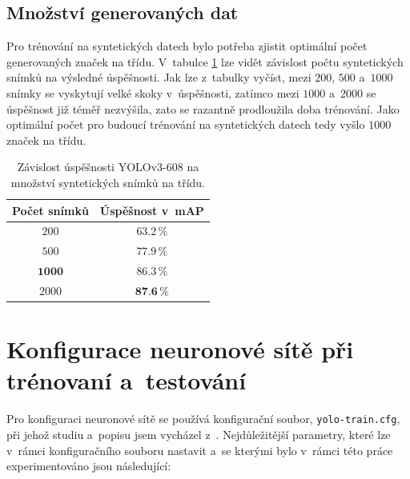 \subsection*{Množství generovaných dat}
Pro trénování na syntetických datech bylo potřeba zjistit optimální počet generovaných značek na třídu. V~tabulce \ref{tab:pocetSnimkuUspesnost} lze vidět závislost počtu syntetických snímků na výsledné úspěšnosti. Jak lze z~tabulky vyčíst, mezi $200$, $500$ a~$1000$ snímky se vyskytují velké skoky v~úspěšnosti, zatímco mezi $1000$ a~$2000$ se úspěšnost již téměř nezvýšila, zato se razantně prodloužila doba trénování. Jako optimální počet pro budoucí trénování na syntetických datech tedy vyšlo $1000$ značek na třídu.

\begin{table}[h]
	\vskip6pt
	\caption{Závislost úspěšnosti YOLOv3-608 na množství syntetických snímků na třídu.}
	\centering
	\begin{tabular}{cc}
		\toprule
		Počet snímků & Úspěšnost v~mAP\\
		\midrule
		$200$  & $63.2\,\%$ \\
		$500$  & $77.9\,\%$ \\
		$\textbf{1000}$ & $86.3\,\%$ \\
		$2000$ & $\textbf{87.6}\,\%$ \\
		\bottomrule
	\end{tabular}
	\label{tab:pocetSnimkuUspesnost}
\end{table}


\section{Konfigurace neuronové sítě při trénovaní a~testování}
\label{cnnKonfigurace}
Pro konfiguraci neuronové sítě se používá konfigurační soubor, \texttt{yolo-train.cfg}, při jehož studiu a~popisu jsem vycházel z~\cite{darknet_config, darknet_anchors}. Nejdůležitější parametry, které lze v~rámci konfiguračního souboru nastavit a~se kterými bylo v~rámci této práce experimentováno jsou následující:

